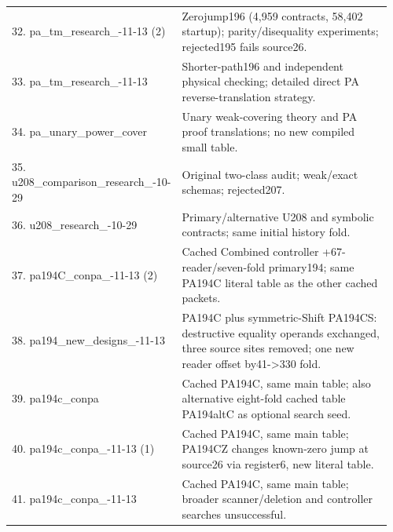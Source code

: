 \begin{longtable}{@{}p{0.34\linewidth}p{0.62\linewidth}@{}}
32. pa\_\allowbreak tm\_\allowbreak research\_\allowbreak 2026-11-13 (2) & Zerojump196 (4,959 contracts, 58,402 startup); parity/disequality experiments; rejected195 fails source26.\\[5pt]
33. pa\_\allowbreak tm\_\allowbreak research\_\allowbreak 2026-11-13 & Shorter-path196 and independent physical checking; detailed direct PA reverse-translation strategy.\\[5pt]
34. pa\_\allowbreak unary\_\allowbreak power\_\allowbreak cover & Unary weak-covering theory and PA proof translations; no new compiled small table.\\[5pt]
35. u208\_\allowbreak comparison\_\allowbreak research\_\allowbreak 2026-10-29 & Original two-class audit; weak/exact schemas; rejected207.\\[5pt]
36. u208\_\allowbreak research\_\allowbreak 2026-10-29 & Primary/alternative U208 and symbolic contracts; same initial history fold.\\[5pt]
37. pa194C\_\allowbreak conpa\_\allowbreak 2026-11-13 (2) & Cached Combined controller +67-reader/seven-fold primary194; same PA194C literal table as the other cached packets.\\[5pt]
38. pa194\_\allowbreak new\_\allowbreak designs\_\allowbreak 2026-11-13 & PA194C plus symmetric-Shift PA194CS: destructive equality operands exchanged, three source sites removed; one new reader offset by41->330 fold.\\[5pt]
39. pa194c\_\allowbreak conpa & Cached PA194C, same main table; also alternative eight-fold cached table PA194altC as optional search seed.\\[5pt]
40. pa194c\_\allowbreak conpa\_\allowbreak 2026-11-13 (1) & Cached PA194C, same main table; PA194CZ changes known-zero jump at source26 via register6, new literal table.\\[5pt]
41. pa194c\_\allowbreak conpa\_\allowbreak 2026-11-13 & Cached PA194C, same main table; broader scanner/deletion and controller searches unsuccessful.\\[5pt]
\end{longtable}\normalsize
